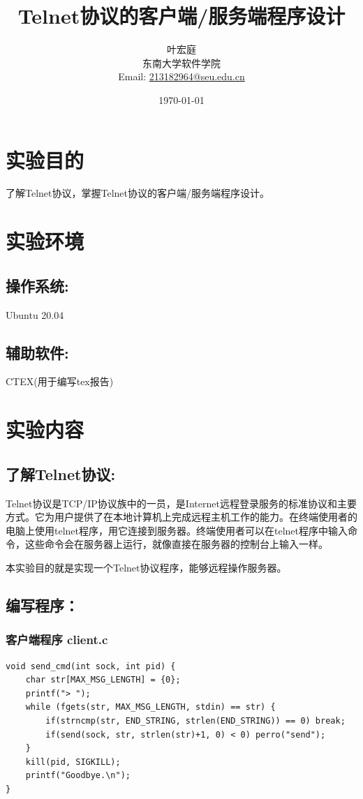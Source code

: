 \documentclass[UTF8]{ctexart}
\author{\small{\kaishu 71118415 叶宏庭}\\[2pt]
\small{\kaishu 东南大学软件学院}\\[2pt]
\small{Email:}
\url{213182964@seu.edu.cn}
}
\title{\Huge{\heiti Telnet协议的客户端/服务端程序设计}}
\date{\today} %
\begin{document}
\maketitle

\section{实验目的}{了解Telnet协议，掌握Telnet协议的客户端/服务端程序设计。}

\section{实验环境}
\subsection{操作系统:}{Ubuntu 20.04}
\subsection{辅助软件:}{CTEX(用于编写tex报告)}
\section{实验内容}
\subsection{了解Telnet协议:}{Telnet协议是TCP/IP协议族中的一员，是Internet远程登录服务的标准协议和主要方式。它为用户提供了在本地计算机上完成远程主机工作的能力。在终端使用者的电脑上使用telnet程序，用它连接到服务器。终端使用者可以在telnet程序中输入命令，这些命令会在服务器上运行，就像直接在服务器的控制台上输入一样。}
\par{本实验目的就是实现一个Telnet协议程序，能够远程操作服务器。}
\subsection{编写程序：}
\subsubsection{客户端程序 client.c}
\begin{lstlisting}
void send_cmd(int sock, int pid) {
	char str[MAX_MSG_LENGTH] = {0};
	printf("> ");
	while (fgets(str, MAX_MSG_LENGTH, stdin) == str) {
		if(strncmp(str, END_STRING, strlen(END_STRING)) == 0) break;
		if(send(sock, str, strlen(str)+1, 0) < 0) perro("send");
	}
	kill(pid, SIGKILL);
	printf("Goodbye.\n");
}
\end{lstlisting}
\end{document}
